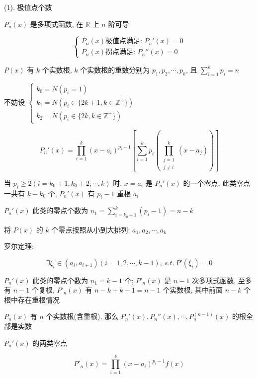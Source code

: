 \begin{anymark}[证明]

	(1). 极值点个数

	$P_{n}(x)$ 是多项式函数, 在 $\mathbb{R}$ 上 $n$ 阶可导
	
	$$\begin{cases}
	  P_{n}(x) \text{极值点满足: } P_{n}'(x) = 0\\
	  P_{n}(x) \text{拐点满足: } P_{n}''(x) = 0
	\end{cases}$$

	$P(x)$ 有 $k$ 个实数根, $k$ 个实数根的重数分别为 $p_{1},p_{2},\cdots,p_{k}$, 且 $\sum\limits_{i = 1}^{k}p_{i}= n$

	不妨设 $\begin{cases}
		k_{0} = N(p_{i} = 1)\\
		k_{1} = N(p_{i} \in \{2k + 1, k \in \mathbb{Z}^{+}\})\\
		k_{2} = N(p_{i} \in \{2k, k \in \mathbb{Z}^{+}\})
	\end{cases}$

	$$P_{n}'(x) =  \prod\limits_{i = 1}^{k}(x-a_{i})^{p_{i}-1} \left[\sum\limits_{i = 1}^{k}p_{i} \left(\prod\limits_{\substack{j = 1 \\ j\neq i}}^{k}(x - a_{j})\right)\right]$$

	当 $p_{i} \geq 2(i = k_{0} + 1, k_{0} + 2,\cdots,k)$ 时, $x = a_{i}$ 是 $P_{n}'(x)$ 的一个零点,
	此类零点一共有 $k - k_{0}$ 个, $P_{n}'(x)$ 有 $p_{i}-1$ 重根 $a_{i}$

	$P_{n}'(x)$ 此类的零点个数为 $n_{1} = \sum\limits_{i = k_{0} + 1}^{k}(p_{i}-1) = n-k$
	
	将 $P(x)$ 的 $k$ 个零点按照从小到大排列: $a_{1}, a_{2},\cdots,a_{k}$

	罗尔定理:
	
	$$\exists \xi_{i} \in (a_{i},a_{i+1})(i = 1, 2, \cdots, k-1),\ s.t.\ P'(\xi_{i}) = 0$$
	
	$P_{n}'(x)$ 此类的零点个数为 $n_{1} = k - 1$ 个; $P'_{n}(x)$ 是 $n-1$ 次多项式函数, 至多有 $n-1$ 个复根, 
	$P'_{n}(x)$ 有 $n-k+k-1 = n-1$ 个实数根, 其中前面 $n-k$ 个根中存在重根情况

	\begin{corollary}[多项式函数零点]
		$P_{n}(x)$ 有 $n$ 个实数根(含重根), 那么 $P_{n}'(x),P_{n}''(x),\cdots,P_{n}^{(n-1)}(x)$ 的根全部是实数
	\end{corollary}

	$P_{n}'(x)$ 的两类零点
	
	$$P'_{n}(x) = \prod\limits_{i = 1}^{k}(x - a_{i})^{p_{i} - 1}f(x)$$
	

\end{anymark}
